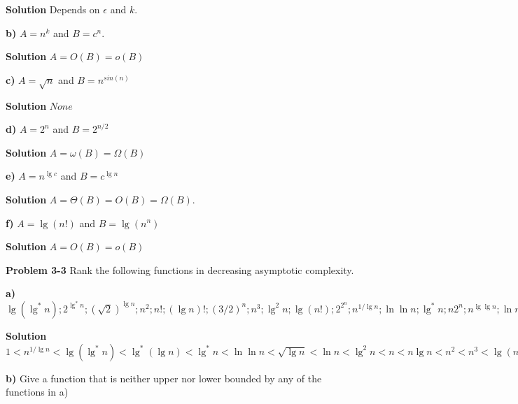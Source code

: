 \documentclass{article}
\begin{document}
\medskip

\textbf{Solution} Depends on $\epsilon$ and $k$.

\medskip

\textbf{b)} $A = n^k$ and $B = c^n$.

\medskip

\textbf{Solution} $A = O(B) = o(B)$

\medskip

\textbf{c)} $A = \sqrt{n}$ and $B = n^{sin(n)}$

\medskip

\textbf{Solution} $None$

\medskip

\textbf{d)} $A = 2^n$ and $B = 2^{n/2}$

\medskip

\textbf{Solution} $A = \omega(B) = \Omega(B)$

\medskip

\textbf{e)} $A = n^{\lg c}$ and $B = c^{\lg n}$

\medskip

\textbf{Solution} $A = \Theta(B) = O(B) = \Omega(B)$.

\medskip

\textbf{f)} $A = \lg(n!)$ and $B = \lg(n^n)$

\medskip

\textbf{Solution} $A = O(B) = o(B)$

\hrulefill

\textbf{Problem 3-3} Rank the following functions in decreasing asymptotic complexity.

\medskip

\textbf{a)} $\lg(\lg^* n); 2^{\lg^* n}; (\sqrt{2})^{\lg n}; n^2; n!; (\lg n)!; (3/2)^n; n^3; \lg^2 n; \lg(n!); 2^{2^n}; n^{1/\lg n}; \ln \ln n; \lg^* n; n2^n; n^{\lg \lg n}; \ln n; 1; 2^{\lg n}; (\lg n)^(\lg n); e^n; 4^{\lg n}; (n+1)!; \sqrt{\lg n}; \lg^*(\lg n); 2^{\sqrt(2) \lg n}; n; 2^n; n \lg n; 2^{2^n + 1}$

\medskip

\textbf{Solution} $1 < n^{1/\lg n} < \lg(\lg^* n) < \lg^*(\lg n) < \lg^* n < \ln \ln n < \sqrt{\lg n} < \ln n < \lg^2 n < n < n \lg n < n^2 < n^3 < \lg(n!) < n^{\lg \lg n} < 2^{\lg^* n} < (\sqrt{2})^{\lg n} < 2^{\lg n} < 2^{\sqrt(2) \lg n} < 4^{\lg n} < 2^n < e^n < (3/2)^n < n2^n < (\lg n)! < (\lg n)^(\lg n) < n! < (n+1)! < 2^{2^n} < 2^{2^n + 1}$

\medskip

\textbf{b)} Give a function that is neither upper nor lower bounded by any of the functions in a)
\end{document}
